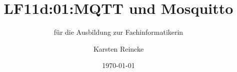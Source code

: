 \documentclass[]{beamer}
\title{LF11d:01:MQTT und Mosquitto}
\subtitle{für die Ausbildung zur Fachinformatikerin}
\institute{GS-LDK}
\author{Karsten Reincke}
\date{\today}
\def\cfgGl{../../../cfg.gl/}
\begin{document}

\begin{frame}
  \titlepage
\end{frame}






\logo{}
\newpage




\end{document}
